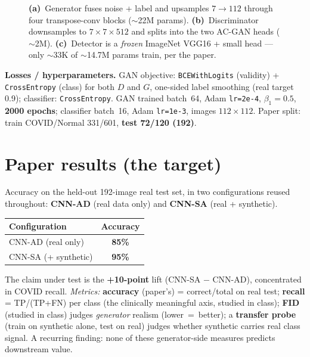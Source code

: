 \documentclass[11pt]{article}
\newcommand{\code}[1]{\texttt{#1}}
\begin{document}
\begin{figure}[htbp]
{}
\caption{\textbf{(a)}~Generator fuses noise + label and upsamples $7{\to}112$ through
four transpose-conv blocks ($\sim$22M params). \textbf{(b)}~Discriminator downsamples
to $7{\times}7{\times}512$ and splits into the two AC-GAN heads ($\sim$2M).
\textbf{(c)}~Detector is a \emph{frozen} ImageNet VGG16 + small head --- only
$\sim$33K of $\sim$14.7M params train, per the paper.}
\label{fig:arch}
\end{figure}

\noindent\textbf{Losses / hyperparameters.} GAN objective: \code{BCEWithLogits}
(validity) + \code{CrossEntropy} (class) for both $D$ and $G$, one-sided label
smoothing (real target 0.9); classifier: \code{CrossEntropy}. GAN trained batch~64,
Adam \code{lr=2e-4}, $\beta_1{=}0.5$, \textbf{2000 epochs}; classifier batch~16,
Adam \code{lr=1e-3}, images $112{\times}112$. Paper split: train COVID/Normal
331/601, \textbf{test 72/120 (192)}.

\section{Paper results (the target)}
Accuracy on the held-out 192-image real test set, in two configurations reused
throughout: \textbf{CNN-AD} (real data only) and \textbf{CNN-SA} (real + synthetic).

\begin{table}[htbp]\centering
\begin{tabular}{@{}lc@{}}\toprule
\textbf{Configuration} & \textbf{Accuracy} \\ \midrule
CNN-AD (real only) & \textbf{85\%} \\
CNN-SA (+ synthetic) & \textbf{95\%} \\ \bottomrule
\end{tabular}\end{table}

\noindent The claim under test is the \textbf{+10-point} lift (CNN-SA $-$ CNN-AD),
concentrated in COVID recall. \emph{Metrics:} \textbf{accuracy} (paper's) =
correct/total on real test; \textbf{recall} = TP/(TP+FN) per class (the clinically
meaningful axis, studied in class); \textbf{FID} (studied in class) judges
\emph{generator} realism (lower~=~better); a \textbf{transfer probe} (train on
synthetic alone, test on real) judges whether synthetic carries real class signal. A
recurring finding: none of these generator-side measures predicts downstream value.
\end{document}
